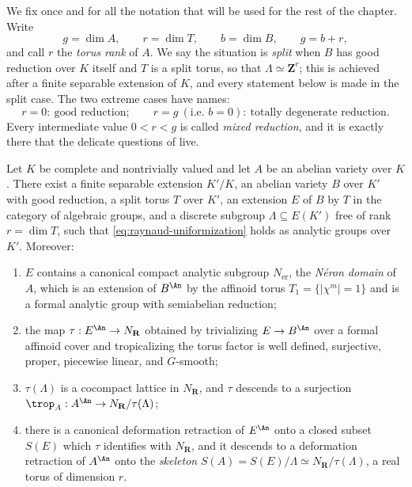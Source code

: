 We fix once and for all the notation that will be used for the rest of the
chapter.  Write
\[
 g=\dim A,\qquad r=\dim T,\qquad b=\dim B,\qquad g=b+r,
\]
and call $r$ the \emph{torus rank} of $A$.  We say the situation is
\emph{split} when $B$ has good reduction over $K$ itself and $T$ is a
split torus, so that $\Lambda\simeq\mathbf Z^r$; this is achieved after a
finite separable extension of $K$, and every statement below is made in
the split case.  The two extreme cases have names:
\[
 r=0:\ \text{good reduction};
 \qquad
 r=g\ (\text{i.e.\ }b=0):\ \text{totally degenerate reduction}.
\]
Every intermediate value $0<r<g$ is called \emph{mixed reduction}, and it
is exactly there that the delicate questions of
 live.

\begin{theorem}
\label{thm:ch19-raynaud}
Let $K$ be complete and nontrivially valued and let $A$ be an abelian
variety over $K$.  There exist a finite separable extension $K'/K$, an
abelian variety $B$ over $K'$ with good reduction, a split torus $T$
over $K'$, an extension $E$ of $B$ by $T$ in the category of
algebraic groups, and a discrete subgroup $\Lambda\subseteq E(K')$ free of
rank $r=\dim T$, such that
\eqref{eq:raynaud-uniformization} holds as analytic groups over $K'$.
Moreover:
\begin{enumerate}
\item\label{itm:ch19-ray:neron} $E$ contains a canonical compact analytic
 subgroup $N_{\mathrm{er}}$, the \emph{N\'eron domain} of $A$, which is
 an extension of $B^{\An}$ by the affinoid torus $T_1=\{|\chi^m|=1\}$
 and is a formal analytic group with semiabelian reduction;
\item\label{itm:ch19-ray:trop} the map
 $\tau:E^{\An}\to N_{\mathbf R}$ obtained by trivializing
 $E\to B^{\An}$ over a formal affinoid cover and tropicalizing the torus
 factor is well defined, surjective, proper, piecewise linear, and
 $G$-smooth;
\item\label{itm:ch19-ray:lattice} $\tau(\Lambda)$ is a cocompact lattice
 in $N_{\mathbf R}$, and $\tau$ descends to a surjection
 $\trop_A:A^{\An}\to N_{\mathbf R}/\tau(\Lambda)$;
\item\label{itm:ch19-ray:skeleton} there is a canonical deformation
 retraction of $E^{\An}$ onto a closed subset $S(E)$ which $\tau$
 identifies with $N_{\mathbf R}$, and it descends to a deformation
 retraction of $A^{\An}$ onto the \emph{skeleton}
 $S(A)=S(E)/\Lambda\simeq N_{\mathbf R}/\tau(\Lambda)$, a real torus of
 dimension $r$.
\end{enumerate}
\end{theorem}

